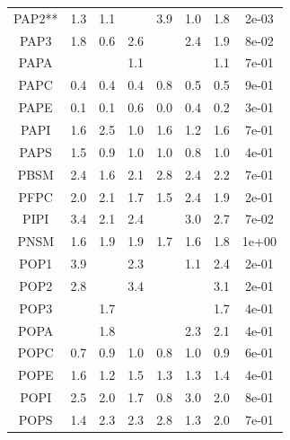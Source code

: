 \documentclass[9pt]{article}
\begin{document}
\begin{table}
{\begin{tabular}{| c || ccccc |cc|}
PAP2**    &            1.3 &         1.1 &           &            3.9 &          1.0 &  1.8 &  2e-03 \\
PAP3    &            1.8 &         0.6 &          2.6 &             &          2.4 &  1.9 &  8e-02 \\
PAPA    &             &          &          1.1 &             &           &  1.1 &  7e-01 \\
PAPC    &            0.4 &         0.4 &          0.4 &            0.8 &          0.5 &  0.5 &  9e-01 \\
PAPE    &            0.1 &         0.1 &          0.6 &            0.0 &          0.4 &  0.2 &  3e-01 \\
PAPI    &            1.6 &         2.5 &          1.0 &            1.6 &          1.2 &  1.6 &  7e-01 \\
PAPS    &            1.5 &         0.9 &          1.0 &            1.0 &          0.8 &  1.0 &  4e-01 \\
PBSM    &            2.4 &         1.6 &          2.1 &            2.8 &          2.4 &  2.2 &  7e-01 \\
PFPC    &            2.0 &         2.1 &          1.7 &            1.5 &          2.4 &  1.9 &  2e-01 \\
PIPI    &            3.4 &         2.1 &          2.4 &             &          3.0 &  2.7 &  7e-02 \\
PNSM    &            1.6 &         1.9 &          1.9 &            1.7 &          1.6 &  1.8 &  1e+00 \\
POP1    &            3.9 &          &          2.3 &             &          1.1 &  2.4 &  2e-01 \\
POP2    &            2.8 &          &          3.4 &             &           &  3.1 &  2e-01 \\
POP3    &             &         1.7 &           &             &           &  1.7 &  4e-01 \\
POPA    &             &         1.8 &           &             &          2.3 &  2.1 &  4e-01 \\
POPC    &            0.7 &         0.9 &          1.0 &            0.8 &          1.0 &  0.9 &  6e-01 \\
POPE    &            1.6 &         1.2 &          1.5 &            1.3 &          1.3 &  1.4 &  4e-01 \\
POPI    &            2.5 &         2.0 &          1.7 &            0.8 &          3.0 &  2.0 &  8e-01 \\
POPS    &            1.4 &         2.3 &          2.3 &            2.8 &          1.3 &  2.0 &  7e-01 \\

\end{tabular}}
\end{table}
\end{document}
